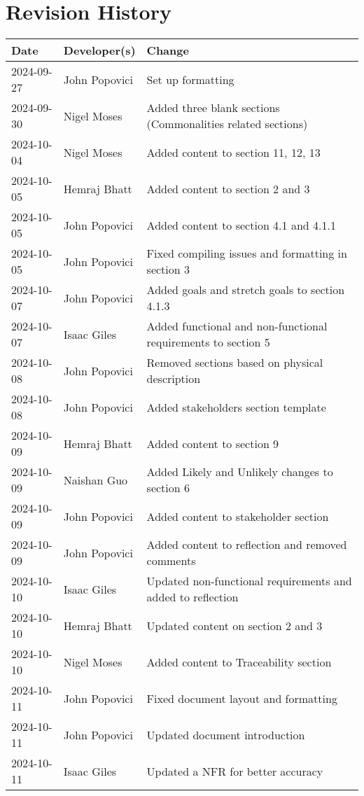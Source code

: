 \section*{Revision History}

\begin{table}[H]
\begin{tabularx}{\textwidth}{llX}
\toprule
\textbf{Date} & \textbf{Developer(s)} & \textbf{Change}\\
\midrule
2024-09-27 & John Popovici & Set up formatting\\
2024-09-30 & Nigel Moses & Added three blank sections (Commonalities related sections)\\
2024-10-04 & Nigel Moses & Added content to section 11, 12, 13\\
2024-10-05 & Hemraj Bhatt & Added content to section 2 and 3\\
2024-10-05 & John Popovici & Added content to section 4.1 and 4.1.1\\
2024-10-05 & John Popovici & Fixed compiling issues and formatting in section 3\\
2024-10-07 & John Popovici & Added goals and stretch goals to section 4.1.3\\
2024-10-07 & Isaac Giles & Added functional and non-functional requirements to section 5\\
2024-10-08 & John Popovici & Removed sections based on physical description\\
2024-10-08 & John Popovici & Added stakeholders section template\\
2024-10-09 & Hemraj Bhatt & Added content to section 9\\
2024-10-09 & Naishan Guo & Added Likely and Unlikely changes to section 6\\
2024-10-09 & John Popovici & Added content to stakeholder section\\
2024-10-09 & John Popovici & Added content to reflection and removed comments\\
2024-10-10 & Isaac Giles & Updated non-functional requirements and added to reflection\\
2024-10-10 & Hemraj Bhatt & Updated content on section 2 and 3\\
2024-10-10 & Nigel Moses & Added content to Traceability section\\
2024-10-11 & John Popovici & Fixed document layout and formatting\\
2024-10-11 & John Popovici & Updated document introduction\\
2024-10-11 & Isaac Giles & Updated a NFR for better accuracy\\

\end{tabularx}
\end{table}
